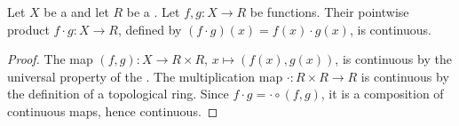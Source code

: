 \begin{proposition} \label{proposition:pointwise_product_of_continuous_functions_on_topological_spaces_valued_in_topological_ring_is_continuous}
    Let $X$ be a  and let $R$ be a . Let $f,g : X \to R$ be  functions. Their pointwise product $f \cdot g : X \to R$, defined by $(f \cdot g)(x) = f(x) \cdot g(x)$, is continuous.
\end{proposition}
\begin{proof}
    The map $(f,g) : X \to R \times R$, $x \mapsto (f(x), g(x))$, is continuous by the universal property of the . The multiplication map $\cdot : R \times R \to R$ is continuous by the definition of a topological ring. Since $f \cdot g = \cdot \circ (f,g)$, it is a composition of continuous maps, hence continuous.
\end{proof}